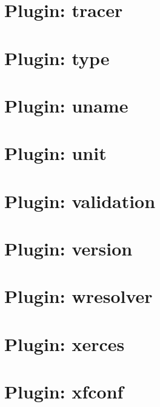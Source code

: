 \let\mypdfximage\pdfximage\def\pdfximage{\immediate\mypdfximage}\documentclass[twoside]{book}
\newcommand{\+}{\discretionary{\mbox{\scriptsize$\hookleftarrow$}}{}{}}
\begin{document}
\chapter{Plugin\+: tracer}
\label{md_src_plugins_tracer_README}

\chapter{Plugin\+: type}
\label{md_src_plugins_type_README}

\chapter{Plugin\+: uname}
\label{md_src_plugins_uname_README}

\chapter{Plugin\+: unit}
\label{md_src_plugins_unit_README}

\chapter{Plugin\+: validation}
\label{md_src_plugins_validation_README}

\chapter{Plugin\+: version}
\label{md_src_plugins_version_README}

\chapter{Plugin\+: wresolver}
\label{md_src_plugins_wresolver_README}

\chapter{Plugin\+: xerces}
\label{md_src_plugins_xerces_README}

\chapter{Plugin\+: xfconf}
\label{md_src_plugins_xfconf_README}

\end{document}
